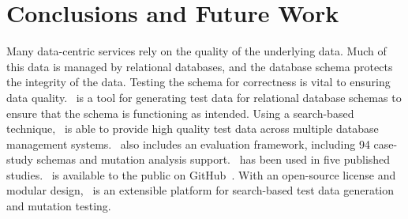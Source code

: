 \section{Conclusions and Future Work}\label{sec:conclusion}

Many data-centric services rely on the quality of the underlying data. Much of this data is managed by relational
databases, and the database schema protects the integrity of the data.  Testing the schema for correctness is vital to
ensuring data quality. \sa~is a tool for generating test data for relational database schemas to ensure that the schema
is functioning as intended. Using a search-based technique, \sa~is able to provide high quality test data across
multiple database management systems. \sa~also includes an evaluation framework, including 94 case-study schemas and
mutation analysis support. \sa~has been used in five published studies. \sa~is available to the public on
GitHub~\cite{tool}. With an open-source license and modular design, \sa~is an extensible platform for search-based test
data generation and mutation testing.
